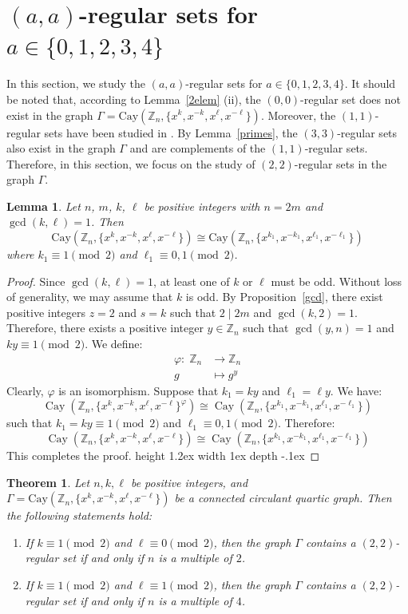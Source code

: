 \documentclass[12pt]{article}
\def\bull{\vrule height 1.2ex width 1ex depth -.1ex }
\newtheorem{lem}[formula]{Lemma}
\newtheorem{thm}[formula]{Theorem}
\begin{document}
\section{\bf $(a,a)$-regular sets for $a \in \{0,1,2,3,4\}$}
\quad In this section, we study the $(a,a)$-regular sets for $a \in \{0,1,2,3,4\}$.
It should be noted that, according to Lemma~\ref{2elem} (ii), the $(0,0)$-regular set does not exist in the graph
$\Gamma = \mathrm{Cay}(\mathbb{Z}_n,\{x^k, x^{-k}, x^\ell, x^{-\ell}\})$. Moreover, the $(1,1)$-regular sets have been studied in \cite{KSC}.
By Lemma~\ref{primes}, the $(3,3)$-regular sets also exist in the graph $\Gamma$
and are complements of the $(1,1)$-regular sets.
Therefore, in this section, we focus on the study of $(2,2)$-regular sets
in the graph $\Gamma$.
\begin{lem}\label{lem:even_case}
	Let $n$, $m$, $k$, $\ell$ be positive integers with $n=2m$ and $\gcd(k,\ell)=1$. Then
	\[
	\mathrm{Cay}(\mathbb{Z}_n,\{x^k, x^{-k}, x^\ell, x^{-\ell}\}) \cong
	\mathrm{Cay}(\mathbb{Z}_n,\{x^{k_1}, x^{-k_1}, x^{\ell_1}, x^{-\ell_1}\})
	\]
	where $k_1 \equiv 1 \pmod{2}$ and $\ell_1 \equiv 0,1 \pmod{2}$.
\end{lem}
\begin{proof}
Since $\gcd(k,\ell)=1$, at least one of $k$ or $\ell$ must be odd.
Without loss of generality, we may assume that $k$ is odd. By Proposition~\ref{gcd}, there exist positive integers $z=2$ and $s=k$ such that $2 \mid 2m$ and $\gcd(k,2)=1$. Therefore, there exists a positive integer $y \in \mathbb{Z}_n$ such that
$\gcd(y,n)=1$ and $ky \equiv 1 \pmod{2}$.
We define:
\[
\begin{aligned}
	\varphi :\; \mathbb{Z}_n &\to \mathbb{Z}_n \\
    g &\mapsto g^{y}
\end{aligned}
\]
Clearly, $\varphi$ is an isomorphism. Suppose that $k_1 = ky$ and $\ell_1 = \ell y$. We have:
\[
\operatorname{Cay}(\mathbb{Z}_n,\{x^k, x^{-k}, x^{\ell}, x^{-\ell}\}^{\varphi})
\cong
\operatorname{Cay}(\mathbb{Z}_n,\{x^{k_1}, x^{-k_1}, x^{\ell_1}, x^{-\ell_1}\})
\]
such that $k_1 = ky \equiv 1 \pmod{2}$ and $\ell_1 \equiv 0,1 \pmod{2}$. Therefore:
\[
\operatorname{Cay}(\mathbb{Z}_n,\{x^k, x^{-k}, x^{\ell}, x^{-\ell}\})
\cong
\operatorname{Cay}(\mathbb{Z}_n,\{x^{k_1}, x^{-k_1}, x^{\ell_1}, x^{-\ell_1}\})
\]
 This completes the proof. \hfill\bull
\end{proof}
\begin{thm}\label{$(2,2)$}
	Let $n, k, \ell$ be positive integers, and $\Gamma = \mathrm{Cay}(\mathbb{Z}_n, \{x^k, x^{-k}, x^\ell, x^{-\ell}\})$ be a connected circulant quartic graph. Then the following statements hold:
	\begin{enumerate}
		\item[(i)] If $k \equiv 1 \pmod{2}$ and $\ell \equiv 0 \pmod{2}$, then the graph $\Gamma$ contains a $(2,2)$-regular set if and only if $n$ is a multiple of $2$.
		\item[(ii)] If $k \equiv 1 \pmod{2}$ and $\ell \equiv 1 \pmod{2}$, then the graph $\Gamma$ contains a $(2,2)$-regular set if and only if $n$ is a multiple of $4$.
	\end{enumerate}
	\end{thm}
\end{document}
